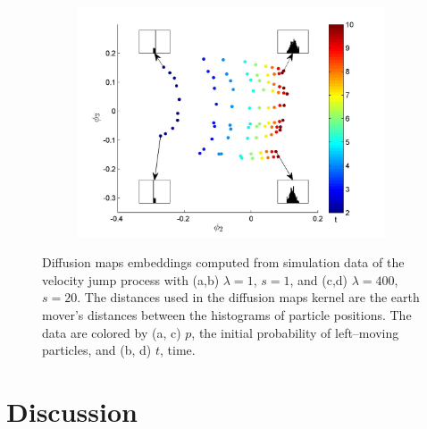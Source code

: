 \documentclass[prl,reprint]{revtex4-1}
\begin{document}
\begin{figure}[htb]
\begin{subfigure}{0.4\textwidth}
\caption{}
\end{subfigure}
\begin{subfigure}{0.4\textwidth}
\includegraphics[width=\textwidth]{EMD_withhist_t_400}
\caption{}
\end{subfigure}
\caption{Diffusion maps embeddings computed from simulation data of the velocity jump process with (a,b) $\lambda=1$, $s=1$, and (c,d) $\lambda=400$, $s=20$. The distances used in the diffusion maps kernel are the earth mover's distances between the histograms of particle positions. The data are colored by (a, c) $p$, the initial probability of left--moving particles, and (b, d) $t$, time. }
\label{fig:dmaps_embed_emd}
\end{figure}

\section{Discussion}



\end{document}
